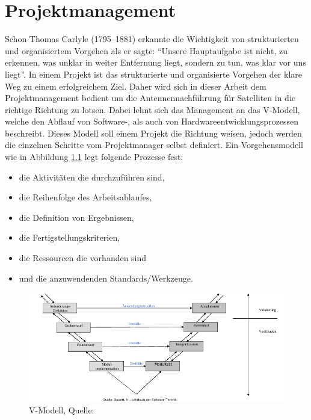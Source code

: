 
\chapter{Projektmanagement}
Schon Thomas Carlyle (1795–1881) erkannte die Wichtigkeit von strukturierten und organisiertem Vorgehen als er sagte:\newpar
``Unsere Hauptaufgabe ist nicht, zu erkennen, was unklar in weiter Entfernung liegt, sondern zu tun, was klar vor uns liegt''.\newpar
In einem Projekt ist das strukturierte und organisierte Vorgehen der klare Weg zu einem erfolgreichem Ziel. Daher wird sich in dieser Arbeit
dem Projektmanagement bedient um die Antennennachführung für Satelliten in die richtige Richtung zu lotsen. Dabei lehnt sich das Management an 
das V-Modell, welche den Abflauf von Software-, als auch von Hardwareentwicklungsprozessen beschreibt. Dieses Modell soll einem Projekt 
die Richtung weisen, jedoch werden die einzelnen Schritte vom Projektmanager selbst definiert. Ein Vorgehensmodell wie in Abbildung \ref{fig:vmodell} 
legt folgende Prozesse fest:
\begin{itemize}
 \item die Aktivitäten die durchzuführen sind,
 \item die Reihenfolge des Arbeitsablaufes,
 \item die Definition von Ergebnissen,
 \item die Fertigstellungskriterien,
 \item die Ressourcen die vorhanden sind
 \item und die anzuwendenden Standards/Werkzeuge.
\end{itemize}
\begin{figure}[h]
 \centering
 \includegraphics[width=0.8\linewidth]{./images/vmodell}
 \caption{V-Modell, Quelle: \cite{swscript}} %
 \label{fig:vmodell}
\end{figure}
